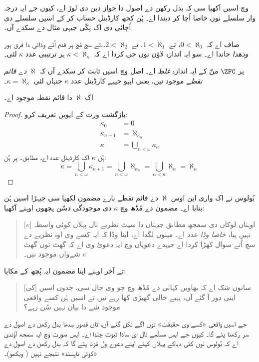 \documentclass[../../../include/open-logic-section]{subfiles}
\begin{document}

 وچ اسیں آکھیا سی کہ بدل رکھن دے اصول دا جواز دین دی لوڑ اے، کیوں جے ایہ درجہ وار سلسلے نوں خاصا اُچا کر دیندا اے۔ ہُن کجھ کارڈینل حساب کر کے اسیں سلسلے دی اُچائی دی اک نِکّی جیہی مثال دے سکدے آں۔

صاف اے کہ $0 < \aleph_0$، تے $1 < \aleph_1$، تے $2 < \aleph_2$\ldots تے سچ مُچ ہر قدم اُتے وڈائی دا فرق ہور \emph{ودھدا} جاندا اے۔ سو ایہ اندازہ لاؤن نوں جی کردا اے کہ $\kappa< \aleph_\kappa$ ہر ترتیبی عدد $\kappa$ لئی۔

پر $\ZFC$ منّ کے ایہ اندازہ \emph{غلط} اے۔ اصل وچ اسیں ثابت کر سکدے آں کہ \emph{$\aleph$ دے قائم نقطے} موجود نیں، یعنی ایہو جیہے کارڈینل عدد $\kappa$ جنہاں لئی $\kappa=\aleph_\kappa$۔

\begin{prop}
اک $\aleph$ دا قائم نقطہ موجود اے۔
\end{prop}

\begin{proof}
بازگشت ورت کے ایویں تعریف کرو:
\begin{align*}
	\kappa_0 &= 0\\
	\kappa_{n+1} &= \aleph_{\kappa_n}\\
	\kappa&= \bigcup_{n < \omega}\kappa_n
\end{align*}
ہُن $\kappa$ اک کارڈینل عدد اے،  مطابق۔ پر ہُن:
\[
	\kappa= \bigcup_{n < \omega} \kappa_{n+1} =
	\bigcup_{n < \omega}\aleph_{\kappa_n} =
	\bigcup_{\alpha < \kappa}\aleph_\alpha = \aleph_\kappa
\]
\end{proof}

بُولوس نے اک واری این اوس $\aleph$ دے قائم نقطے بارے مضمون لکھیا سی جیہڑا اسیں ہُن بنایا اے۔ مضمون دے مُڈھ وچ $\kappa$ دی موجودگی دسّن پچھوں اوہنے آکھیا:
\begin{quote}
	[$\kappa$] اوہناں لوکاں دی سمجھ مطابق جیہناں دا سیٹ نظریے نال پہلاں کوئی واسطہ نہیں پیا، \emph{خاصا وڈا} عدد اے۔ مینوں لگدا اے، اینا وڈا کہ ایہ کسے وی اوہ نظریے دے سچ اُتے سوال کھڑا کردا اے جیہدے دعویاں وچ ایہ دعویٰ وی اے کہ گھٹ توں گھٹ $\kappa$ شےواں موجود نیں۔
	\citep[p.~257]{Boolos2000}
\end{quote}
تے آخر اوہنے اپنا مضمون ایہ پُچھ کے مکایا:
\begin{quote}
	[کی] سانوں شک اے کہ بھاویں کہانی دے مُڈھ وچ جو وی حال سی، جدوں اسیں اینی دور آ گئے آں، پہیے خالی گھیڑی کھا رہے نیں تے اسیں ہُن کسے واقعی موجود شے دا بیان نہیں سُن رہے؟
	\citep[p.~268]{Boolos2000}
\end{quote}
جے اسیں واقعی «کسے وی حقیقت» توں اگے نکل گئے آں، تاں قصور سِدھا بدل رکھن دے اصول دے سر رکھنا پئے گا۔ کیوں جے ایس مسلّمے نال ای ساڈا ثبوت چلدا اے۔ ایس صورت وچ ایہ سمجھ آؤندی اے کہ بُولوس نوں کئی دہاکے پہلاں کیتے اپنے دعوے ول مُڑنا پئے گا کہ بدل رکھن دے اصول دے «کوئی ناپسند» نتیجے نہیں ( ویکھو)۔
\end{document}
